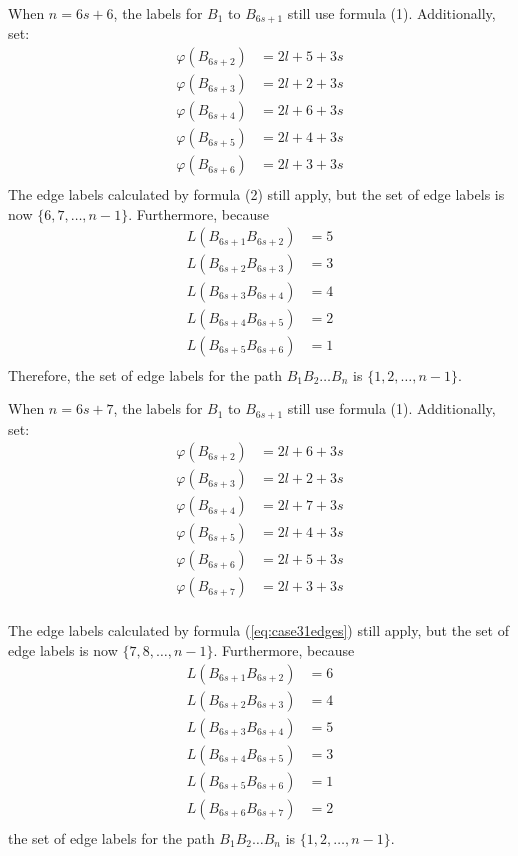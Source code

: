 \documentclass[fleqn,svgnames,screen,acmsmall]{ml2rcn}
\begin{document}
\begin{description}
\vspace{0.5\baselineskip}

\item[Case (3-4)]
When $n = 6s + 6$, the labels for $B_{1}$ to $B_{6s+1}$ still use formula (1). Additionally, set:
\[
\begin{aligned}
\varphi(B_{6s+2}) &= 2l + 5 + 3s \\ 
\varphi(B_{6s+3}) &= 2l + 2 + 3s \\ 
\varphi(B_{6s+4}) &= 2l + 6 + 3s \\
\varphi(B_{6s+5}) &= 2l + 4 + 3s \\ 
\varphi(B_{6s+6}) &= 2l + 3 + 3s \\
\end{aligned}
\]
The edge labels calculated by formula (2) still apply, but the set of edge labels is now $\{6, 7, \ldots, n-1\}$. Furthermore, because
\[
\begin{aligned}
L(B_{6s+1}B_{6s+2}) &= 5 \\
L(B_{6s+2}B_{6s+3}) &= 3 \\
L(B_{6s+3}B_{6s+4}) &= 4 \\
L(B_{6s+4}B_{6s+5}) &= 2 \\
L(B_{6s+5}B_{6s+6}) &= 1 \\
\end{aligned}
\]
Therefore, the set of edge labels for the path $B_{1}B_{2}\ldots B_{n}$ is $\{1, 2, \ldots, n-1\}$.

\vspace{0.5\baselineskip}

\item[Case (3-5)] 
When $n = 6s + 7$, the labels for $B_{1}$ to $B_{6s+1}$ still use formula (1). Additionally, set:
\[
\begin{aligned}
\varphi(B_{6s+2}) &= 2l + 6 + 3s \\
\varphi(B_{6s+3}) &= 2l + 2 + 3s \\
\varphi(B_{6s+4}) &= 2l + 7 + 3s \\
\varphi(B_{6s+5}) &= 2l + 4 + 3s \\
\varphi(B_{6s+6}) &= 2l + 5 + 3s \\
\varphi(B_{6s+7}) &= 2l + 3 + 3s \\
\end{aligned}
\]

The edge labels calculated by formula (\ref{eq:case31edges}) still apply, but the set of edge labels is now $\{7, 8, \ldots, n-1\}$. 
Furthermore, because
\[
\begin{aligned}
L(B_{6s+1}B_{6s+2}) &= 6 \\
L(B_{6s+2}B_{6s+3}) &= 4 \\
L(B_{6s+3}B_{6s+4}) &= 5 \\
L(B_{6s+4}B_{6s+5}) &= 3 \\
L(B_{6s+5}B_{6s+6}) &= 1 \\
L(B_{6s+6}B_{6s+7}) &= 2 \\
\end{aligned}
\]
the set of edge labels for the path $B_{1}B_{2}\ldots B_{n}$ is $\{1, 2, \ldots, n-1\}$.


\end{description}
\end{document}
